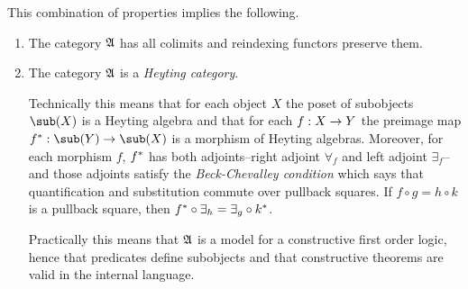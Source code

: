 \documentclass[csh.tex]{subfiles}
\begin{document}
This combination of properties implies the following.
\begin{enumerate}
\item The category $\mathfrak A$ has all colimits and reindexing functors preserve them. 
\item The category $\mathfrak A$ is a \emph{Heyting category}. 

Technically this means that for each object $X$ the poset of subobjects $\sub(X)$ is a Heyting algebra and that for each $f: X\to Y$ the preimage map $f\ri\of\sub(Y)\to\sub(X)$ is a morphism of Heyting algebras. Moreover, for each morphism $f$, $f^*$ has both adjoints--right adjoint $\forall_f$ and left adjoint $\exists_f$--and those adjoints satisfy the \emph{Beck-Chevalley condition} which says that quantification and substitution commute over pullback squares. If $f\circ g = h\circ k$ is a pullback square, then $f^*\circ\exists_h=\exists_g\circ k^*$.

Practically this means that $\mathfrak A$ is a model for a constructive first order logic, hence that predicates define subobjects and that constructive theorems are valid in the internal language.
\end{enumerate}
\end{document}
